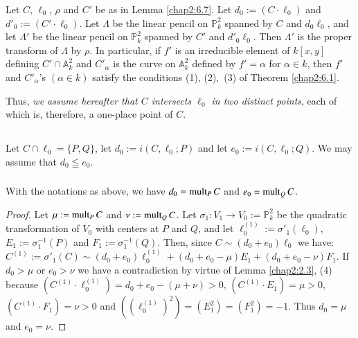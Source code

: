 \begin{remark*}
Let $C$, $\ell_{0}$, $\rho$ and $C'$ be as in Lemma \ref{chap2:6.7}. Let
$d_{0}:=(C\cdot\ell_{0})$ and $d'_{0}:=(C'\cdot\ell_{0})$. Let
$\Lambda$ be the linear pencil on $\mathbb{P}^{2}_{k}$ spanned by $C$
and $d_{0}\ell_{0}$, and let $\Lambda'$ be the linear pencil on
$\mathbb{P}^{2}_{k}$ spanned by $C'$ and $d'_{0}\ell_{0}$. Then
$\Lambda'$ is the proper transform of $\Lambda$ by $\rho$. In
particular, if $f'$ is an irreducible element of $k[x,y]$ defining
$C'\cap \mathbb{A}^{2}_{k}$ and $C'_{\alpha}$ is the curve on
$\mathbb{A}^{2}_{k}$ defined by $f'=\alpha$ for $\alpha\in k$, then
$f'$ and $C'_{\alpha}$'s $(\alpha\in k)$ satisfy the conditions (1),
(2),\pageoriginale\ (3) of Theorem \ref{chap2:6.1}.
\end{remark*}

Thus, {\em we assume hereafter that $C$ intersects $\ell_{0}$ in two
  distinct points}, each of which is, therefore, a one-place point of
$C$.

\subsection{}\label{chap2:6.8}
Let $C\cap \ell_{0}=\{P,Q\}$, let $d_{0}:=i(C,\ell_{0};P)$ and let
$e_{0}:=i(C,\ell_{0};Q)$. We may assume that $d_{0}\leqq e_{0}$.

\subsubsection{}\label{chap2:6.8.1}
\begin{lemma*}
  With the notations as above, we have $d_{0}=\operatorname{mult}_{P}C$ and
  $e_{0}=\operatorname{mult}_{Q}C$. 
\end{lemma*}

\begin{proof}
Let $\mu:=\operatorname{mult}_{P}C$ and $\nu:=\operatorname{mult}_{Q}C$. Let $\sigma_{1}:V_{1}\to
V_{0}:=\mathbb{P}^{2}_{k}$ be the quadratic transformation of $V_{0}$
with centers at $P$ and $Q$, and let
$\ell^{(1)}_{0}:=\sigma'_{1}(\ell_{0})$, $E_{1}:=\sigma^{-1}_{1}(P)$
and $F_{1}:=\sigma^{-1}_{1}(Q)$. Then, since $C\sim
(d_{0}+e_{0})\ell_{0}$ we have: $C^{(1)}:=\sigma'_{1}(C)\sim
(d_{0}+e_{0})\ell^{(1)}_{0}+(d_{0}+e_{0}-\mu)E_{1}+(d_{0}+e_{0}-\nu)F_{1}$. If
$d_{0}>\mu$ or $e_{0}>\nu$ we have a contradiction by virtue of Lemma
\ref{chap2:2.3}, (4) because
$(C^{(1)}\cdot\ell_{0}^{(1)})=d_{0}+e_{0}-(\mu+\nu)>0$, $(C^{(1)}\cdot
E_{1})=\mu>0$, $(C^{(1)}\cdot F_{1})=\nu>0$ and
$((\ell^{(1)}_{0})^{2})=(E^{2}_{1})=(F^{2}_{1})=-1$. Thus $d_{0}=\mu$
and $e_{0}=\nu$.
\end{proof}


